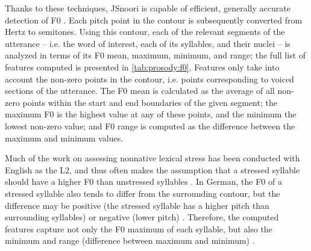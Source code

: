 	Thanks to these techniques, JSnoori is capable of efficient, generally accurate detection of F0 
	. Each pitch point in the contour is subsequently converted from Hertz to semitones.
	Using this contour, each of the relevant segments of the utterance -- i.e. the word of interest, each of its syllables, and their nuclei -- is analyzed in terms of its F0 mean, maximum, minimum, and range;
	the full list of features computed is presented in \cref{tab:prosody:f0}.
	Features only take into account the non-zero points in the contour, i.e. points corresponding to voiced sections of the utterance. The F0 mean is calculated as the average of all non-zero points within the start and end boundaries of the given segment; the maximum F0 is the highest value at any of these points, and the minimum the lowest non-zero value; and F0 range is computed as the difference between the maximum and minimum values. 
	
	
	Much of the work on assessing nonnative lexical stress has been conducted with English as the L2, and thus often makes the assumption that a stressed syllable should have a higher F0 than unstressed syllables \citep{Bonneau2011}. In German, the F0 of a stressed syllable also tends to differ from the surrounding contour, but the difference may be positive (the stressed syllable has a higher pitch than surrounding syllables) or negative (lower pitch) \citep[p.~267]{Cutler2005}. 		%
	Therefore, the computed features
	capture not only the F0 maximum of each syllable, but also the minimum and range (difference between maximum and minimum) .
	 
	


